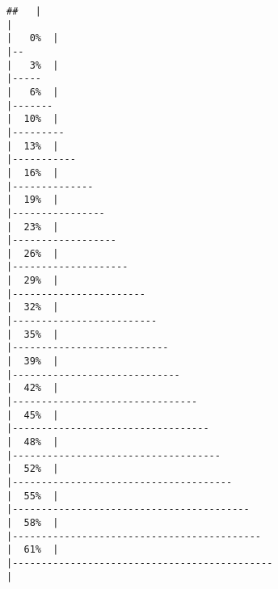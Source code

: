 \documentclass[
]{article}
\begin{document}
\begin{verbatim}
##   |                                                                              |                                                                      |   0%  |                                                                              |--                                                                    |   3%  |                                                                              |-----                                                                 |   6%  |                                                                              |-------                                                               |  10%  |                                                                              |---------                                                             |  13%  |                                                                              |-----------                                                           |  16%  |                                                                              |--------------                                                        |  19%  |                                                                              |----------------                                                      |  23%  |                                                                              |------------------                                                    |  26%  |                                                                              |--------------------                                                  |  29%  |                                                                              |-----------------------                                               |  32%  |                                                                              |-------------------------                                             |  35%  |                                                                              |---------------------------                                           |  39%  |                                                                              |-----------------------------                                         |  42%  |                                                                              |--------------------------------                                      |  45%  |                                                                              |----------------------------------                                    |  48%  |                                                                              |------------------------------------                                  |  52%  |                                                                              |--------------------------------------                                |  55%  |                                                                              |-----------------------------------------                             |  58%  |                                                                              |-------------------------------------------                           |  61%  |                                                                              |---------------------------------------------                         |  
\end{verbatim}
\end{document}
